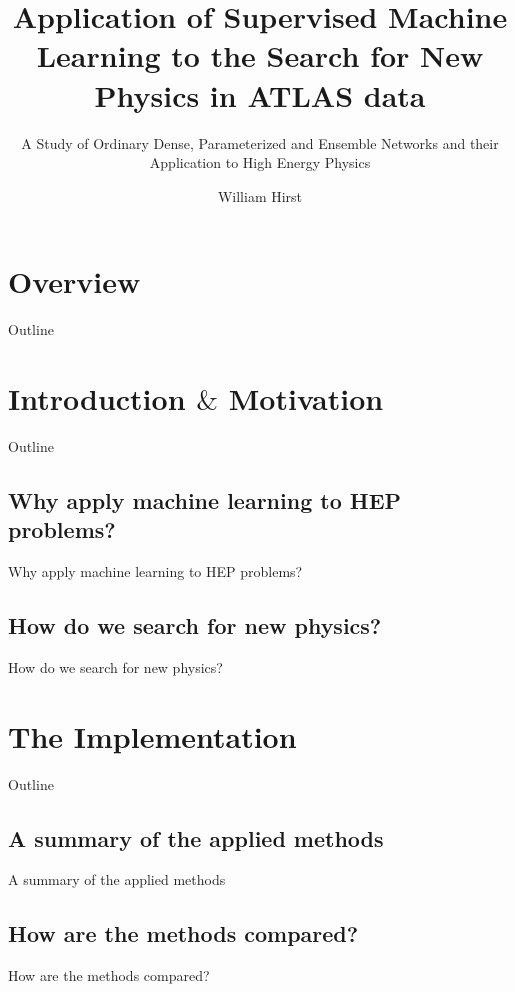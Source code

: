 \documentclass[UKenglish]{beamer}
\author{William Hirst}
\title[Supervised Learning in HEP]{Application of Supervised Machine Learning to the Search for New Physics in ATLAS data}
\subtitle{A Study of Ordinary Dense, Parameterized and Ensemble Networks and their Application to High Energy Physics}
\begin{document}
\section{Overview}

\begin{frame}{Outline}
    \tableofcontents
\end{frame}

\SectionPage


\section{Introduction $\&$ Motivation}
\begin{frame}{Outline}
    \tableofcontents[currentsection]
\end{frame}

\subsection{Why apply machine learning to HEP problems?}
\begin{frame}{Why apply machine learning to HEP problems?}
 
\end{frame}


\subsection{How do we search for new physics?}
\begin{frame}{How do we search for new physics?}
 
\end{frame}

\section{The Implementation}
\begin{frame}{Outline}
    \tableofcontents[currentsection]
\end{frame}

\subsection{A summary of the applied methods}
\begin{frame}{A summary of the applied methods}
 
\end{frame}

\subsection{How are the methods compared?}
\begin{frame}{How are the methods compared?}
 
\end{frame}
\end{document}
